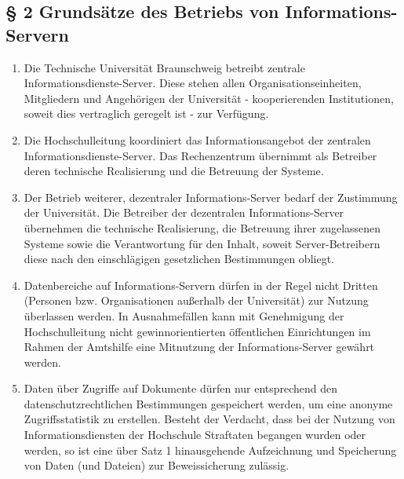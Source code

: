 \subsection*{§ 2 Grundsätze des Betriebs von Informations-Servern}
\begin{enumerate}
\item 
 Die Technische Universität Braunschweig betreibt zentrale Informationsdienste-Server. Diese stehen allen Organisationseinheiten, Mitgliedern und Angehörigen der Universität - kooperierenden Institutionen, soweit dies vertraglich geregelt ist - zur Verfügung.
\item Die Hochschulleitung koordiniert das Informationsangebot der zentralen Informationsdienste-Server. Das Rechenzentrum übernimmt als Betreiber deren technische Realisierung und die Betreuung der Systeme. 
\item Der Betrieb weiterer, dezentraler Informations-Server bedarf der Zustimmung der Universität. Die Betreiber der dezentralen Informations-Server übernehmen die technische Realisierung, die Betreuung ihrer zugelassenen Systeme sowie die Verantwortung für den Inhalt, soweit Server-Betreibern diese nach den einschlägigen gesetzlichen Bestimmungen obliegt. 
\item Datenbereiche auf Informations-Servern dürfen in der Regel nicht Dritten (Personen bzw. Organisationen außerhalb der Universität) zur Nutzung überlassen werden. In Ausnahmefällen kann mit Genehmigung der Hochschulleitung nicht gewinnorientierten öffentlichen Einrichtungen im Rahmen der Amtshilfe eine Mitnutzung der Informations-Server gewährt werden.
\item Daten über Zugriffe auf Dokumente dürfen nur entsprechend den datenschutzrechtlichen Bestimmungen gespeichert werden, um eine anonyme Zugriffsstatistik zu erstellen.
Besteht der Verdacht, dass bei der Nutzung von Informationsdiensten der Hochschule Straftaten begangen wurden oder werden, so ist eine über Satz 1 hinausgehende Aufzeichnung und Speicherung von Daten (und Dateien) zur Beweissicherung zulässig.
\end{enumerate}
